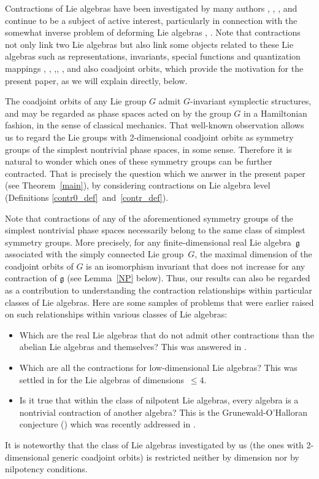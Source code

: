 \documentclass[
reqno]{amsart}
\begin{document}
Contractions of Lie algebras have been investigated by many authors \cite{Sa61},
\cite{He66}, \cite{LeN67}, \cite{We91} and continue to be a subject of active interest, particularly
in connection with the somewhat inverse problem of deforming Lie algebras \cite{FM05},
\cite{Bu07}. 
Note that contractions not only link two Lie algebras but also link some objects related to these Lie algebras
such as representations, invariants, special functions and quantization mappings \cite{MN72},
\cite{DR85}, \cite{CW99},\cite{Cp07}, 
\cite{Ca09}, 
and also coadjoint orbits, which provide the motivation for the present paper, 
as we will explain directly, below.

The coadjoint orbits of any Lie group $G$ admit $G$-invariant symplectic structures, 
and may be regarded as phase spaces acted on by the group $G$ in a Hamiltonian fashion, 
in the sense of classical mechanics. 
That well-known observation allows us to regard the Lie groups with 
2-dimensional coadjoint orbits 
as symmetry groups of the simplest nontrivial phase spaces, in some sense. 
Therefore it is natural to wonder which ones of these symmetry groups 
can be further contracted. 
That is precisely the question which we answer in the present paper 
(see Theorem~\ref{main}), 
by considering contractions on Lie algebra level (Definitions \ref{contr0_def}~and~\ref{contr_def}). 

Note that contractions of any of the aforementioned symmetry groups of the simplest nontrivial phase spaces 
necessarily belong to the same class of simplest symmetry groups.  
More precisely, for any finite-dimensional real Lie algebra~${{\mathfrak g}}$ associated with the simply connected Lie group~$G$, 
the maximal dimension of the coadjoint orbits of $G$ is an isomorphism invariant that does not increase 
for any contraction of ${{\mathfrak g}}$ (see Lemma~\ref{NP} below). 
Thus, 
our results can also be regarded as a contribution to understanding 
the contraction relationships within particular classes of Lie algebras. 
Here are some samples of problems that were earlier raised on such relationships 
within various classes of Lie algebras: 
\begin{itemize}
\item Which are the real Lie algebras that do not admit other contractions 
than the abelian Lie algebras and themselves? 
This was answered in \cite{La03}. 
\item Which are all the contractions for low-dimensional Lie algebras? 
This was settled in \cite{NP06} for the Lie algebras of dimensions~$\le 4$. 
\item Is it true that within the class of nilpotent Lie algebras, 
every algebra is a nontrivial contraction of another algebra? 
This is the Grunewald-O'Halloran conjecture (\cite{GO93}) 
which was recently addressed in \cite{HT13}. 
\end{itemize}
It is noteworthy that the class of Lie algebras investigated by us 
(the ones with 2-dimensional generic coadjoint orbits) 
is restricted neither by dimension nor by nilpotency conditions. 
\end{document}
